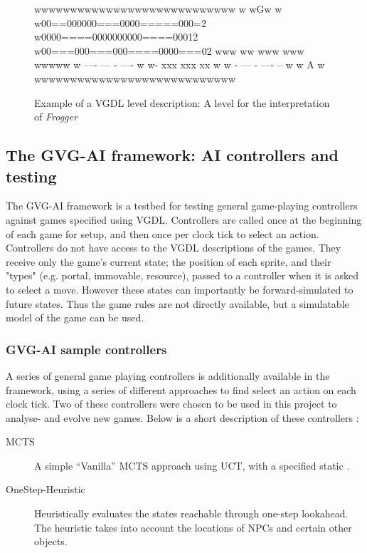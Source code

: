 \documentclass[a4paper,titlepage,final]{report}
\begin{document}
\begin{figure}[!ht]
\centering
\begin{vgdldesc}[linewidth=14cm]
wwwwwwwwwwwwwwwwwwwwwwwwwwww
w           wGw            w
w00==000000===0000=====000=2
w0000====0000000000====00012
w00===000===000====0000===02
www   ww   www    www  wwwww
w   ----   ---   -  ----   w
w-     xxx       xxx    xx w
w -   ---     -   ---- --  w
w       A                  w
wwwwwwwwwwwwwwwwwwwwwwwwwwww
\end{vgdldesc}
\caption{Example of a VGDL level description: A level for the interpretation of \textit{Frogger}}
\label{fig:vgdlgame_level}
\end{figure}



\subsection{The GVG-AI framework: AI controllers and testing}
\label{ssec:aicontrollersandtesting}
The GVG-AI framework is a testbed for testing general game-playing controllers against games specified using VGDL. Controllers are called once at the beginning of each game for setup, and then once per clock tick to select an action. 
Controllers do not have access to the VGDL descriptions of the games. They receive only the game's current state; the position of each sprite, and their "types" (e.g. portal, immovable, resource), passed to a controller when it is asked to select a move. 
However these states can importantly be forward-simulated to future states. 
Thus the game rules are not directly available, but a simulatable model of the game can be used.

\subsubsection*{GVG-AI sample controllers}
A series of general game playing controllers is additionally available in the framework, using a series of different approaches to find select an action on each clock tick.
Two of these controllers were chosen to be used in this project to analyse- and evolve new games.
Below is a short description of these controllers :

\begin{description}
	\item [MCTS] A simple ``Vanilla'' MCTS approach using UCT, with a specified static  .
	\item [OneStep-Heuristic] Heuristically evaluates the states reachable through one-step lookahead. The heuristic takes into account the locations of NPCs and certain other objects.
\end{description}
\end{document}
